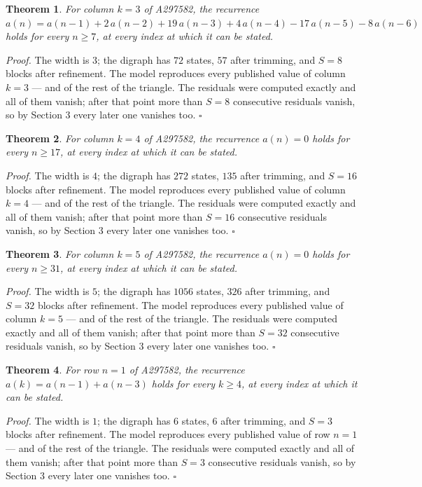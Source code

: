\documentclass[11pt]{article}
\newtheorem{theorem}{Theorem}
\theoremstyle{definition}
\begin{document}
\begin{theorem} For column $k = 3$ of A297582, the recurrence $a(n) = a(n-1) + 2\,a(n-2) + 19\,a(n-3) + 4\,a(n-4) - 17\,a(n-5) - 8\,a(n-6)$ holds for every $n \ge 7$, at every index at which it can be stated.\end{theorem}

{\itshape Proof.} The width is $3$; the digraph has $72$ states, $57$ after trimming, and $S = 8$ blocks after refinement. The model reproduces every published value of column $k = 3$ --- and of the rest of the triangle. The residuals were computed exactly and all of them vanish; after that point more than $S = 8$ consecutive residuals vanish, so by Section 3 every later one vanishes too. $\square$

\begin{theorem} For column $k = 4$ of A297582, the recurrence $a(n) = 0$ holds for every $n \ge 17$, at every index at which it can be stated.\end{theorem}

{\itshape Proof.} The width is $4$; the digraph has $272$ states, $135$ after trimming, and $S = 16$ blocks after refinement. The model reproduces every published value of column $k = 4$ --- and of the rest of the triangle. The residuals were computed exactly and all of them vanish; after that point more than $S = 16$ consecutive residuals vanish, so by Section 3 every later one vanishes too. $\square$

\begin{theorem} For column $k = 5$ of A297582, the recurrence $a(n) = 0$ holds for every $n \ge 31$, at every index at which it can be stated.\end{theorem}

{\itshape Proof.} The width is $5$; the digraph has $1056$ states, $326$ after trimming, and $S = 32$ blocks after refinement. The model reproduces every published value of column $k = 5$ --- and of the rest of the triangle. The residuals were computed exactly and all of them vanish; after that point more than $S = 32$ consecutive residuals vanish, so by Section 3 every later one vanishes too. $\square$

\begin{theorem} For row $n = 1$ of A297582, the recurrence $a(k) = a(n-1) + a(n-3)$ holds for every $k \ge 4$, at every index at which it can be stated.\end{theorem}

{\itshape Proof.} The width is $1$; the digraph has $6$ states, $6$ after trimming, and $S = 3$ blocks after refinement. The model reproduces every published value of row $n = 1$ --- and of the rest of the triangle. The residuals were computed exactly and all of them vanish; after that point more than $S = 3$ consecutive residuals vanish, so by Section 3 every later one vanishes too. $\square$
\end{document}
